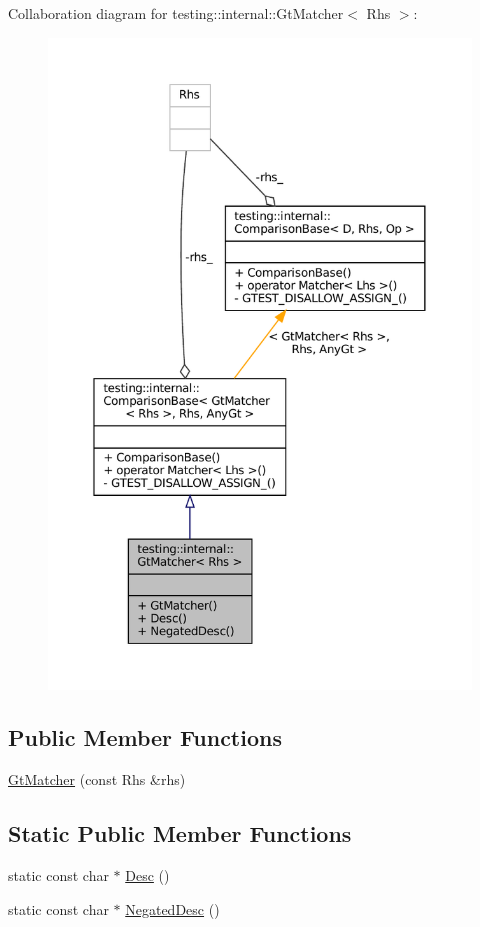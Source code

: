 Collaboration diagram for testing\+:\+:internal\+:\+:Gt\+Matcher$<$ Rhs $>$\+:
\nopagebreak
\begin{figure}[H]
\begin{center}
\leavevmode
\includegraphics[width=350pt]{classtesting_1_1internal_1_1GtMatcher__coll__graph}
\end{center}
\end{figure}
\subsection*{Public Member Functions}
\begin{DoxyCompactItemize}
\item 
\hyperlink{classtesting_1_1internal_1_1GtMatcher_aeef0f6dd7c57a2ed0f379d8100de0215}{Gt\+Matcher} (const Rhs \&rhs)
\end{DoxyCompactItemize}
\subsection*{Static Public Member Functions}
\begin{DoxyCompactItemize}
\item 
static const char $\ast$ \hyperlink{classtesting_1_1internal_1_1GtMatcher_ac4e664e328e4400e1cecc9b804de6937}{Desc} ()
\item 
static const char $\ast$ \hyperlink{classtesting_1_1internal_1_1GtMatcher_ace1dc02e105fd93b638f23433bf682a4}{Negated\+Desc} ()
\end{DoxyCompactItemize}


